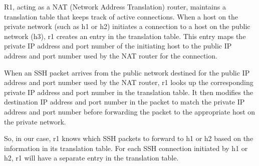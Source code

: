 R1, acting as a NAT (Network Address Translation) router, maintains a translation table that keeps track of active connections. When a host on the private network (such as h1 or h2) initiates a connection to a host on the public network (h3), r1 creates an entry in the translation table. This entry maps the private IP address and port number of the initiating host to the public IP address and port number used by the NAT router for the connection.

When an SSH packet arrives from the public network destined for the public IP address and port number used by the NAT router, r1 looks up the corresponding private IP address and port number in the translation table. It then modifies the destination IP address and port number in the packet to match the private IP address and port number before forwarding the packet to the appropriate host on the private network.

So, in our case, r1 knows which SSH packets to forward to h1 or h2 based on the information in its translation table. For each SSH connection initiated by h1 or h2, r1 will have a separate entry in the translation table.
